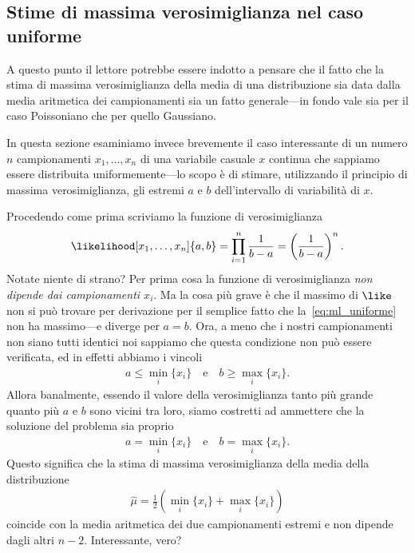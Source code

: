 \subsection{Stime di massima verosimiglianza nel caso uniforme}

A questo punto il lettore potrebbe essere indotto a pensare che il fatto che
la stima di massima verosimiglianza della media di una distribuzione sia data
dalla media aritmetica dei campionamenti sia un fatto generale---in fondo
vale sia per il caso Poissoniano che per quello Gaussiano.

In questa sezione esaminiamo invece brevemente il caso interessante di un
numero $n$ campionamenti $x_1,\ldots,x_n$ di una variabile casuale $x$ continua
che sappiamo essere distribuita uniformemente---lo scopo è di stimare,
utilizzando il principio di massima verosimiglianza, gli estremi $a$ e $b$
dell'intervallo di variabilità di $x$.

Procedendo come prima scriviamo la funzione di verosimiglianza
\begin{align}\label{eq:ml_uniforme}
  \likelihood[x_1,\ldots,x_n]{a, b} = \prod_{i = 1}^n \frac{1}{b - a}=
  \left( \frac{1}{b - a} \right)^n.
\end{align}
Notate niente di strano? Per prima cosa la funzione di verosimiglianza
\emph{non dipende dai campionamenti $x_i$}. Ma la cosa più
grave è che il massimo di $\like$ non si può trovare per derivazione
per il semplice fatto che la~\eqref{eq:ml_uniforme} non ha massimo---e diverge
per $a = b$. Ora, a meno che i nostri campionamenti non siano tutti identici
noi sappiamo che questa condizione non può essere verificata, ed in effetti
abbiamo i vincoli
\begin{align*}
  a \leq \min_i \{ x_i \}  \quad \text{e} \quad
  b \geq \max_i \{ x_i \}.
\end{align*}
Allora banalmente, essendo il valore della verosimiglianza tanto più grande
quanto più $a$ e $b$ sono vicini tra loro, siamo costretti ad ammettere
che la soluzione del problema sia proprio
\begin{align}
  a = \min_i \{ x_i \}  \quad \text{e} \quad
  b = \max_i \{ x_i \}.
\end{align}
Questo significa che la stima di massima verosimiglianza della media della
distribuzione
\begin{align}
  \hat\mu = \frac{1}{2} \left( \min_i \{ x_i \} + \max_i \{ x_i \} \right)
\end{align}
coincide con la media aritmetica dei due campionamenti estremi e non dipende
dagli altri $n - 2$. Interessante, vero?


